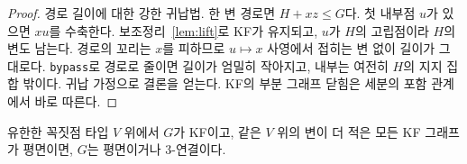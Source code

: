 \begin{proof}
\leanok
경로 길이에 대한 강한 귀납법. 한 변 경로면 \(H+xz \le G\)다. 첫 내부점 \(u\)가 있으면 \(xu\)를
수축한다. 보조정리~\ref{lem:lift}로 KF가 유지되고, \(u\)가 \(H\)의 고립점이라 \(H\)의 변도 남는다.
경로의 꼬리는 \(x\)를 피하므로 \(u \mapsto x\) 사영에서 접히는 변 없이 길이가 그대로다.
\texttt{bypass}로 경로로 줄이면 길이가 엄밀히 작아지고, 내부는 여전히 \(H\)의 지지 집합 밖이다.
귀납 가정으로 결론을 얻는다. KF의 부분 그래프 닫힘은 세분의 포함 관계에서 바로 따른다.
\end{proof}

\begin{theorem}[최소 반례는 3-연결]
\label{thm:reduce}
\leanok
유한한 꼭짓점 타입 \(V\) 위에서 \(G\)가 KF이고, 같은 \(V\) 위의 변이 더 적은 모든 KF 그래프가 평면이면,
\(G\)는 평면이거나 3-연결이다.
\end{theorem}

